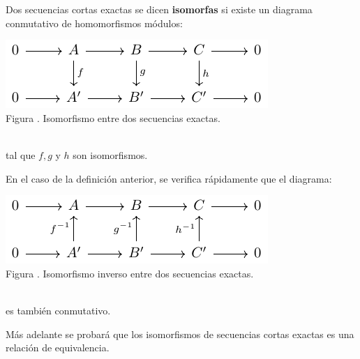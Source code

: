 \documentclass[12pt]{report}
\theoremstyle{largebreak}
\begin{document}
    \begin{mydef}
        Dos secuencias cortas exactas se dicen \textbf{isomorfas} si existe un diagrama conmutativo de homomorfismos módulos:
        
        \begin{minipage}{\textwidth}
            \begin{center}
                \includegraphics[scale=1.5]{images/fig_2.pdf}\\
                Figura \thefigcount. Isomorfismo entre dos secuencias exactas.
            \end{center}
        \end{minipage}
        \\

        tal que $f,g$ y $h$ son isomorfismos.
    \end{mydef}

    \begin{obs}
        En el caso de la definición anterior, se verifica rápidamente que el diagrama:

        \begin{minipage}{\textwidth}
            \begin{center}
                \includegraphics[scale=1.5]{images/fig_3.pdf}\\
                Figura \thefigcount. Isomorfismo inverso entre dos secuencias exactas.
            \end{center}
        \end{minipage}
        \\

        es también conmutativo.
    \end{obs}

    Más adelante se probará que los isomorfismos de secuencias cortas exactas es una relación de equivalencia.
\end{document}
